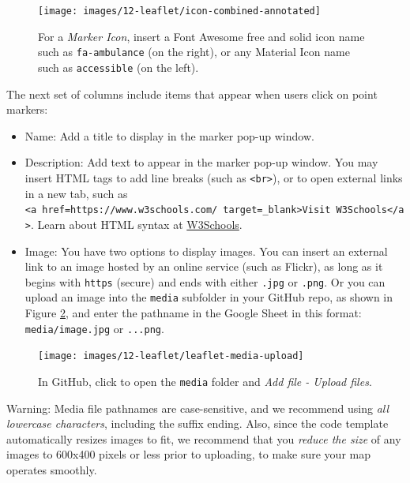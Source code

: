 \documentclass[
  english,
]{book}
\providecommand{\tightlist}{%
  \setlength{\itemsep}{0pt}\setlength{\parskip}{0pt}}
\begin{document}
\begin{figure}
\texttt{[image: images/12-leaflet/icon-combined-annotated]} \caption{For a \emph{Marker Icon}, insert a Font Awesome free and solid icon name such as \texttt{fa-ambulance} (on the right), or any Material Icon name such as \texttt{accessible} (on the left).}\label{fig:icon-combined}
\end{figure}

The next set of columns include items that appear when users click on point markers:

\begin{itemize}
\tightlist
\item
  Name: Add a title to display in the marker pop-up window.
\item
  Description: Add text to appear in the marker pop-up window. You may insert HTML tags to add line breaks (such as \texttt{\textless{}br\textgreater{}}), or to open external links in a new tab, such as \texttt{\textless{}a\ href=\textquotesingle{}https://www.w3schools.com/\textquotesingle{}\ target=\textquotesingle{}\_blank\textquotesingle{}\textgreater{}Visit\ W3Schools\textless{}/a\textgreater{}}. Learn about HTML syntax at \href{https://www.w3schools.com/html/html_links.asp}{W3Schools}.
\item
  Image: You have two options to display images. You can insert an external link to an image hosted by an online service (such as Flickr), as long as it begins with \texttt{https} (secure) and ends with either \texttt{.jpg} or \texttt{.png}. Or you can upload an image into the \texttt{media} subfolder in your GitHub repo, as shown in Figure \ref{fig:leaflet-media-upload}, and enter the pathname in the Google Sheet in this format: \texttt{media/image.jpg} or \texttt{...png}.
\end{itemize}



\begin{figure}
\texttt{[image: images/12-leaflet/leaflet-media-upload]} \caption{In GitHub, click to open the \texttt{media} folder and \emph{Add file - Upload files}.}\label{fig:leaflet-media-upload}
\end{figure}

Warning: Media file pathnames are case-sensitive, and we recommend using \emph{all lowercase characters}, including the suffix ending. Also, since the code template automatically resizes images to fit, we recommend that you \emph{reduce the size} of any images to 600x400 pixels or less prior to uploading, to make sure your map operates smoothly.
\end{document}
